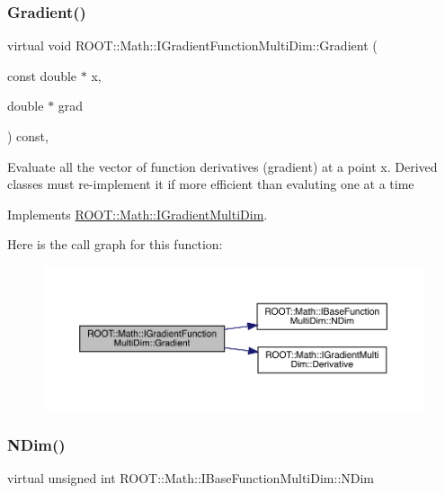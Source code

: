 \subsubsection{\texorpdfstring{Gradient()}{Gradient()}\hspace{0.1cm}{\footnotesize\ttfamily [2/2]}}
{\footnotesize\ttfamily virtual void R\+O\+O\+T\+::\+Math\+::\+I\+Gradient\+Function\+Multi\+Dim\+::\+Gradient (\begin{DoxyParamCaption}\item[{const double $\ast$}]{x,  }\item[{double $\ast$}]{grad }\end{DoxyParamCaption}) const\hspace{0.3cm}{\ttfamily [inline]}, {\ttfamily [virtual]}}

Evaluate all the vector of function derivatives (gradient) at a point x. Derived classes must re-\/implement it if more efficient than evaluting one at a time 

Implements \mbox{\hyperlink{classROOT_1_1Math_1_1IGradientMultiDim_ac5785e2df4fa36061bf9ddbb9ce4dde0}{R\+O\+O\+T\+::\+Math\+::\+I\+Gradient\+Multi\+Dim}}.

Here is the call graph for this function\+:
\nopagebreak
\begin{figure}[H]
\begin{center}
\leavevmode
\includegraphics[width=350pt]{da/d1a/classROOT_1_1Math_1_1IGradientFunctionMultiDim_ab65a713d2637c69b334d2119ef4f0e26_cgraph}
\end{center}
\end{figure}
\mbox{\label{classROOT_1_1Math_1_1IGradientFunctionMultiDim_af046a6f630930e59fe5356a9795aec46}} 
\subsubsection{\texorpdfstring{NDim()}{NDim()}\hspace{0.1cm}{\footnotesize\ttfamily [1/4]}}
{\footnotesize\ttfamily virtual unsigned int R\+O\+O\+T\+::\+Math\+::\+I\+Base\+Function\+Multi\+Dim\+::\+N\+Dim}

